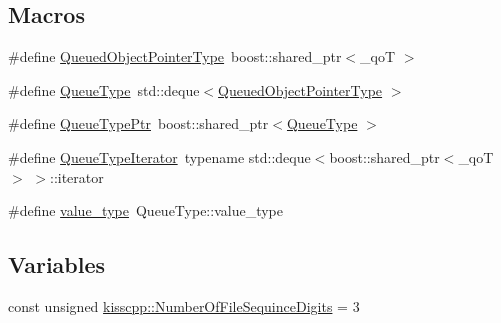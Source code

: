\subsection*{Macros}
\begin{DoxyCompactItemize}
\item 
\#define \hyperlink{a00070_afaed39dc5f50bc993872e2d46490667c}{Queued\-Object\-Pointer\-Type}~boost\-::shared\-\_\-ptr$<$\-\_\-qo\-T $>$
\item 
\#define \hyperlink{a00070_a0f866dc82edb46503a53b3e043f81f2f}{Queue\-Type}~std\-::deque$<$\hyperlink{a00070_afaed39dc5f50bc993872e2d46490667c}{Queued\-Object\-Pointer\-Type} $>$
\item 
\#define \hyperlink{a00070_a36c99d1cf9ec37c4de496d05bf664cd0}{Queue\-Type\-Ptr}~boost\-::shared\-\_\-ptr$<$\hyperlink{a00070_a0f866dc82edb46503a53b3e043f81f2f}{Queue\-Type} $>$
\item 
\#define \hyperlink{a00070_a55cfd939382843e351914f95c204427e}{Queue\-Type\-Iterator}~typename std\-::deque$<$boost\-::shared\-\_\-ptr$<$\-\_\-qo\-T $>$ $>$\-::iterator
\item 
\#define \hyperlink{a00070_a77d3f6a01bab89b6b730110f7809ead6}{value\-\_\-type}~Queue\-Type\-::value\-\_\-type
\end{DoxyCompactItemize}
\subsection*{Variables}
\begin{DoxyCompactItemize}
\item 
const unsigned \hyperlink{a00089_a743621016edf95f7afda64b2da3bb576}{kisscpp\-::\-Number\-Of\-File\-Sequince\-Digits} = 3
\end{DoxyCompactItemize}


